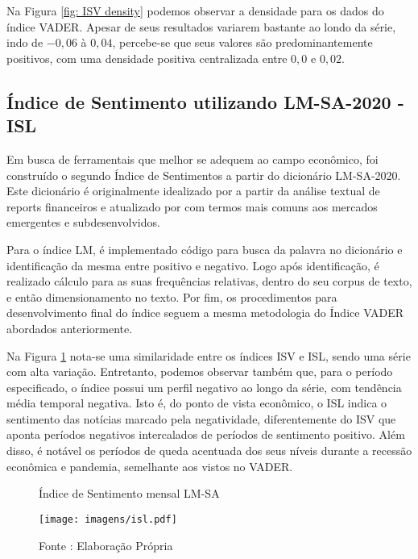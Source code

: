 Na Figura \ref{fig: ISV density} podemos observar a densidade para os dados do índice VADER. Apesar de seus resultados variarem bastante ao londo da série, indo de $-0,06$ à $0,04$, percebe-se que seus valores são predominantemente positivos, com uma densidade positiva centralizada entre $0,0$ e $0,02$. 

\subsection{Índice de Sentimento utilizando LM-SA-2020 - ISL}

Em busca de ferramentais que melhor se adequem ao campo econômico, foi construído o segundo Índice de Sentimentos a partir do dicionário LM-SA-2020. Este dicionário é originalmente idealizado por  a partir da análise textual de reports financeiros e atualizado por  com termos mais comuns aos mercados emergentes e subdesenvolvidos. 


Para o índice LM, é implementado código para busca da palavra no dicionário e identificação da mesma entre positivo e negativo. Logo após identificação, é realizado cálculo para as suas frequências relativas, dentro do seu corpus de texto, e então dimensionamento no texto. Por fim, os procedimentos para desenvolvimento final do índice seguem a mesma metodologia do Índice VADER abordados anteriormente.

Na Figura \ref{fig: ISL} nota-se uma similaridade entre os índices ISV e ISL, sendo uma série com alta variação. Entretanto, podemos observar também que, para o período especificado, o índice possui um perfil negativo ao longo da série, com tendência média temporal negativa. Isto é, do ponto de vista econômico, o ISL indica o sentimento das notícias marcado pela negatividade, diferentemente do ISV que aponta períodos negativos intercalados de períodos de sentimento positivo. Além disso, é notável os períodos de queda acentuada dos seus níveis durante a recessão econômica e pandemia, semelhante aos vistos no VADER.

\begin{figure}[!h]
    \centering
    \caption{Índice de Sentimento mensal LM-SA}
    \label{fig: ISL}
    \texttt{[image: imagens/isl.pdf]}
    \caption*{Fonte : Elaboração Própria}
\end{figure}


